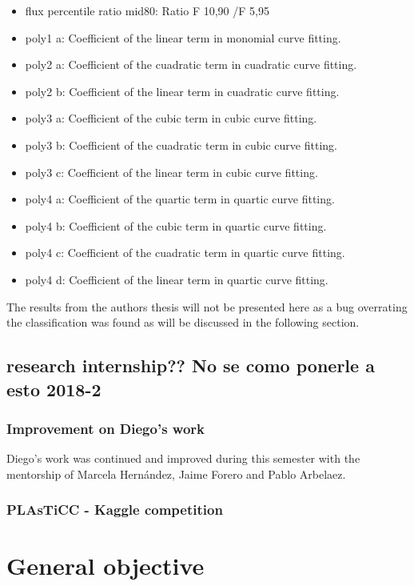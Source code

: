 \begin{itemize}
  \item flux percentile ratio mid80: Ratio F 10,90 /F 5,95
  \item poly1 a: Coefficient of the linear term in monomial curve fitting.
  \item poly2 a: Coefficient of the cuadratic term in cuadratic curve fitting.
  \item poly2 b: Coefficient of the linear term in cuadratic curve fitting.
  \item poly3 a: Coefficient of the cubic term in cubic curve fitting.
  \item poly3 b: Coefficient of the cuadratic term in cubic curve fitting.
  \item poly3 c: Coefficient of the linear term in cubic curve fitting.
  \item poly4 a: Coefficient of the quartic term in quartic curve fitting.
  \item poly4 b: Coefficient of the cubic term in quartic curve fitting.
  \item poly4 c: Coefficient of the cuadratic term in quartic curve fitting.
  \item poly4 d: Coefficient of the linear term in quartic curve fitting.
\end{itemize}

The results from the authors thesis will not be presented here as a bug overrating the classification was found as will be discussed in the following section.

\subsection{research internship?? No se como ponerle a esto 2018-2}

\subsubsection{Improvement on Diego's work}\label{improvementDiego}
Diego's work was continued and improved during this semester with the mentorship of Marcela Hern\'andez, Jaime Forero and Pablo Arbelaez. 

\subsubsection{PLAsTiCC - Kaggle competition}


\section{General objective}
